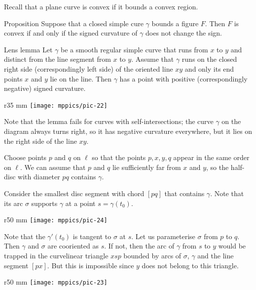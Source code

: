 Recall that a plane curve is convex if it bounds a convex region.

\begin{thm}{Proposition}\label{prop:convex}
Suppose that a closed simple cure $\gamma$ bounds a figure $F$.
Then $F$ is convex if and only if the signed curvature of $\gamma$ does not change the sign.
\end{thm}


\begin{thm}{Lens lemma}\label{lem:lens}
Let $\gamma$ be a smooth regular simple curve that runs from $x$ to $y$ and distinct from the line segment from $x$ to $y$.
Assume that $\gamma$ runs on the closed right side (correspondingly left side) of the oriented line $xy$ and only its end points $x$ and $y$ lie on the line.
Then $\gamma$ has a point with positive  (correspondingly negative) signed curvature.
\end{thm}

\begin{wrapfigure}{r}{35 mm}
\vskip-4mm
\centering
\texttt{[image: mppics/pic-22]}
\vskip0mm
\end{wrapfigure}

Note that the lemma fails for curves with self-intersections;
the curve $\gamma$ on the diagram always turns right, 
so it has negative curvature everywhere, but it lies on the right side of the line $xy$.

Choose points $p$ and $q$ on $\ell$
so that the points $p, x, y, q$ appear in the same order on $\ell$.
We can assume that $p$ and $q$ lie sufficiently far from $x$ and $y$, so the half-disc with diameter $pq$ contains $\gamma$.

Consider the smallest disc segment with chord $[pq]$ that contains $\gamma$.
Note that its arc $\sigma$ supports $\gamma$ at a point $s=\gamma(t_0)$.

\begin{wrapfigure}{r}{50 mm}
\centering
\texttt{[image: mppics/pic-24]}
\vskip0mm
\end{wrapfigure}

Note that the $\gamma'(t_0)$ is tangent to $\sigma$ at $s$.
Let us parameterise $\sigma$ from $p$ to $q$.
Then $\gamma$ and $\sigma$ are cooriented as $s$.
If not, then the arc of $\gamma$ from $s$ to $y$ would be trapped in the curvelinear triangle $xsp$ bounded by arcs of $\sigma$, $\gamma$ and the line segment $[px]$.
But this is impossible since $y$ does not belong to this triangle.

\begin{wrapfigure}{r}{50 mm}
\centering
\texttt{[image: mppics/pic-23]}
\vskip0mm
\end{wrapfigure}

